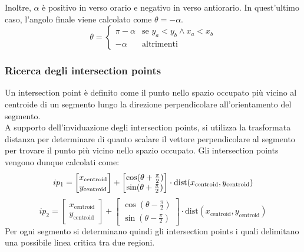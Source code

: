\noindent
Inoltre, $\alpha$ è positivo in verso orario e negativo in verso antiorario. In quest'ultimo caso, l'angolo finale viene calcolato come $\theta = -\alpha$.
\begin{equation}
  \theta = \begin{cases}
    \pi - \alpha & \text{se } y_a < y_b \land x_a < x_b \\
    -\alpha      & \text{altrimenti}
  \end{cases}
\end{equation}
\subsubsection{Ricerca degli intersection points}
Un intersection point è definito come il punto nello spazio occupato più vicino al centroide di un segmento lungo la direzione perpendicolare all'orientamento del segmento.\\
A supporto dell'inviduazione degli intersection points, si utilizza la trasformata distanza per determinare di quanto scalare il vettore perpendicolare al segmento per trovare il punto più vicino nello spazio occupato. Gli intersection points vengono dunque calcolati come:
\begin{equation}
  ip_1 =
  \begin{bmatrix}
    x_{\text{centroid}} \\
    y_{\text{centroid}}
  \end{bmatrix} +
  \begin{bmatrix}
    \cos(\theta + \frac{\pi}{2}) \\
    \sin(\theta + \frac{\pi}{2})
  \end{bmatrix} \cdot \text{dist}(x_{\text{centroid}}, y_{\text{centroid}})\\
\end{equation}
\begin{equation}
  ip_2 =
  \begin{bmatrix}
    x_{\text{centroid}} \\
    y_{\text{centroid}}
  \end{bmatrix} +
  \begin{bmatrix}
    \cos(\theta - \frac{\pi}{2}) \\
    \sin(\theta - \frac{\pi}{2})
  \end{bmatrix} \cdot \text{dist}(x_{\text{centroid}}, y_{\text{centroid}})
\end{equation}
Per ogni segmento si determinano quindi gli intersection points i quali delimitano una possibile linea critica tra due regioni.

